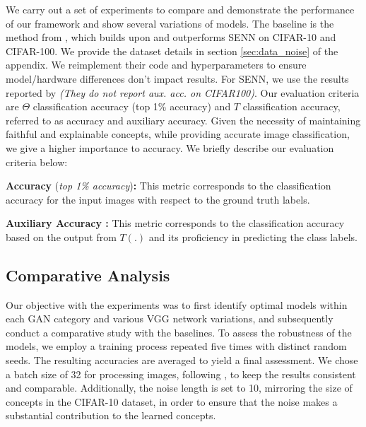 \documentclass[letterpaper]{article}
\begin{document}
We carry out a set of experiments to compare and demonstrate the performance of our framework and show several variations of models. The baseline is the method from \cite{Sarkar2021AFF}, which builds upon and outperforms SENN \cite{SENN} on CIFAR-10 and CIFAR-100. We provide the dataset details in section \ref{sec:data_noise} of the appendix. We reimplement their code and hyperparameters to ensure model/hardware differences don't impact results. For SENN, we use the results reported by \cite{Sarkar2021AFF} \textit{(They do not report aux. acc. on CIFAR100)}. Our evaluation criteria are $\Theta$ classification accuracy (top 1\% accuracy) and $T$ classification accuracy, referred to as accuracy and auxiliary accuracy. Given the necessity of maintaining faithful and explainable concepts, while providing accurate image classification, we give a higher importance to accuracy.
We briefly describe our evaluation criteria below:

\textbf{Accuracy} (\textit{top 1\% accuracy})\textbf{:} This metric corresponds to the classification accuracy for the input images with respect to the ground truth labels.

\textbf{Auxiliary Accuracy \cite{SENN}:} This metric corresponds to the classification accuracy %
based on the output from $T(.)$ and its proficiency in predicting the class labels.



\subsection{Comparative Analysis}\label{sec:our_results}

Our objective with the experiments was to first identify optimal models within each GAN category and various VGG network variations, and subsequently conduct a comparative study with the baselines. To assess the robustness of the models, we employ a training process repeated five times with distinct random seeds. The resulting accuracies are averaged to yield a final assessment.
We chose a batch size of 32 for processing images, following \cite{Sarkar2021AFF}, to keep the results consistent and comparable. Additionally, the noise length is set to 10, mirroring the size of concepts in the CIFAR-10 dataset, in order to ensure that the noise makes a substantial contribution to the learned concepts.
\end{document}
